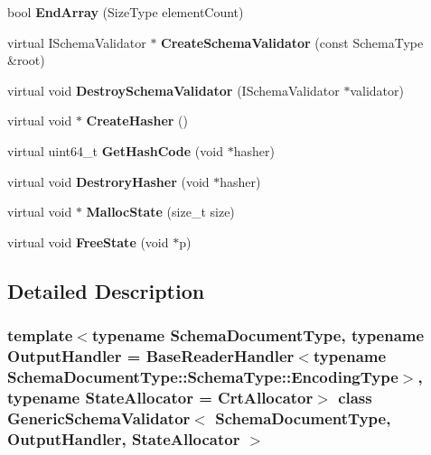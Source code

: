 \begin{DoxyCompactItemize}
bool {\bfseries End\+Array} (Size\+Type element\+Count)
\item 
\mbox{\label{classGenericSchemaValidator_af074f9c8f2cfc07e1b3d3f8862e7ef11}} 
virtual I\+Schema\+Validator $\ast$ {\bfseries Create\+Schema\+Validator} (const Schema\+Type \&root)
\item 
\mbox{\label{classGenericSchemaValidator_ae24fa298e328f1fd7dda2ef6267156d2}} 
virtual void {\bfseries Destroy\+Schema\+Validator} (I\+Schema\+Validator $\ast$validator)
\item 
\mbox{\label{classGenericSchemaValidator_abc377481583ca2095fb784be88887faa}} 
virtual void $\ast$ {\bfseries Create\+Hasher} ()
\item 
\mbox{\label{classGenericSchemaValidator_ac01c45982a1f512e1ca06fe5544b0c0f}} 
virtual uint64\+\_\+t {\bfseries Get\+Hash\+Code} (void $\ast$hasher)
\item 
\mbox{\label{classGenericSchemaValidator_a007eef58be575dc562543d069ddd2710}} 
virtual void {\bfseries Destrory\+Hasher} (void $\ast$hasher)
\item 
\mbox{\label{classGenericSchemaValidator_a7c999dfb3118aaa08495d60eee6d3732}} 
virtual void $\ast$ {\bfseries Malloc\+State} (size\+\_\+t size)
\item 
\mbox{\label{classGenericSchemaValidator_a4e250737a411af2969a9e585a7da4187}} 
virtual void {\bfseries Free\+State} (void $\ast$p)
\end{DoxyCompactItemize}


\subsection{Detailed Description}
\subsubsection*{template$<$typename Schema\+Document\+Type, typename Output\+Handler = Base\+Reader\+Handler$<$typename Schema\+Document\+Type\+::\+Schema\+Type\+::\+Encoding\+Type$>$, typename State\+Allocator = Crt\+Allocator$>$\newline
class Generic\+Schema\+Validator$<$ Schema\+Document\+Type, Output\+Handler, State\+Allocator $>$}

